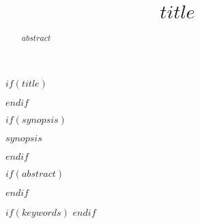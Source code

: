 $if(title)$
\title{$title$}
\maketitle
$endif$



$if(synopsis)$
\begin{synopsis}
$synopsis$
\end{synopsis}
$endif$

$if(abstract)$
\begin{abstract}
$abstract$
\end{abstract}
$endif$

$if(keywords)$
$endif$